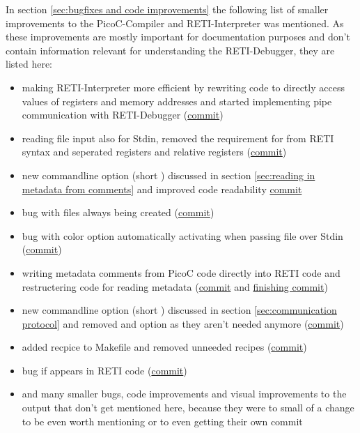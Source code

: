 \documentclass{report}
\begin{document}
In section \ref{sec:bugfixes and code improvements} the following list of smaller improvements to the PicoC-Compiler and RETI-Interpreter was mentioned. As these improvements are mostly important for documentation purposes and don't contain information relevant for understanding the RETI-Debugger, they are listed here:
\begin{itemize}
	\item making RETI-Interpreter more efficient by rewriting code to directly access values of registers and memory addresses and started implementing pipe communication with RETI-Debugger (\href{https://github.com/matthejue/PicoC-Compiler/commit/805bc81ce09530b6deba59f5e823ffa45d319a56}{commit})
	\item reading file input also for Stdin, removed the requirement for \inlinebox{;} from RETI syntax and seperated registers and relative registers (\href{https://github.com/matthejue/PicoC-Compiler/commit/3bfe0868f962c55349d3c9a29f32ea5fa3c20b87}{commit})
	\item new commandline option  (short ) discussed in section \ref{sec:reading in metadata from comments} and improved code readability \href{https://github.com/matthejue/PicoC-Compiler/commit/45fdce3ce9ad8623951d27c3357f86e5a3763018}{commit}
	\item bug with  files always being created (\href{https://github.com/matthejue/PicoC-Compiler/commit/cbd9d148a514413a930daae0dab642c04aefc089}{commit})
	\item bug with color option automatically activating when passing file over Stdin (\href{https://github.com/matthejue/PicoC-Compiler/commit/ef43b17fec8e21909666b53a8ffc0f462ba2e86b}{commit})
	\item writing metadata comments from PicoC code directly into RETI code and restructering code for reading metadata (\href{https://github.com/matthejue/PicoC-Compiler/commit/699f26a6f3394bedb3a8f2708ccb95bb6afffbea}{commit} and \href{https://github.com/matthejue/PicoC-Compiler/commit/f419a36efbb31358526d23e23caba6c9d853f896}{finishing commit})
	\item new commandline option  (short ) discussed in section \ref{sec:communication protocol} and removed  and  option as they aren't needed anymore (\href{https://github.com/matthejue/PicoC-Compiler/commit/8c86290598de81bbdc8fdb08dc531e0bca040f3a}{commit})
	\item added  recpice to Makefile and removed unneeded recipes (\href{https://github.com/matthejue/PicoC-Compiler/commit/d2f5eccb609d1746d9151559f1f4705c1760557b}{commit})
	\item bug if  appears in RETI code (\href{https://github.com/matthejue/PicoC-Compiler/commit/0bc9945013ed387218c0e35c477b41026e1c3d82}{commit})
	\item and many smaller bugs, code improvements and visual improvements to the output that don't get mentioned here, because they were to small of a change to be even worth mentioning or to even getting their own commit
\end{itemize}
\end{document}
